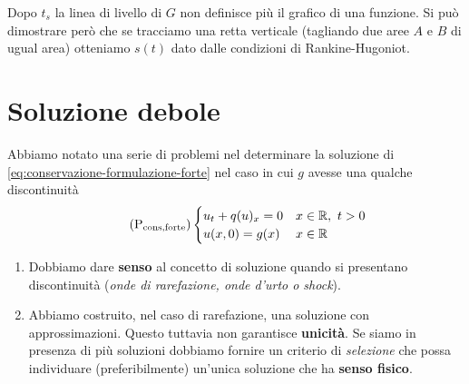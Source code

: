 Dopo $\displaystyle t_{s}$ la linea di livello di $G$ non definisce più il grafico di una funzione.
Si può dimostrare però che se tracciamo una retta verticale (tagliando due aree $A$ e $B$ di ugual area) otteniamo $\displaystyle s(t)$ dato dalle condizioni di Rankine-Hugoniot.


\section{Soluzione debole}

Abbiamo notato una serie di problemi nel determinare la soluzione di \eqref{eq:conservazione-formulazione-forte} nel caso in cui $g$ avesse una qualche discontinuità
\begin{equation}
    \tag{P$_{\text{cons,forte}}$}
    \begin{cases}
        u_{t} +q(u)_{x} =0 & x\in \mathbb{R} ,\ t >0 \\
        u(x,0) =g(x)       & x\in \mathbb{R}
    \end{cases}
    \label{eq:conservazione-formulazione-forte}
\end{equation}
\begin{enumerate}
    \item Dobbiamo dare \textbf{senso} al concetto di soluzione quando si presentano discontinuità (\textit{onde di rarefazione, onde d'urto o shock}).
    \item Abbiamo costruito, nel caso di rarefazione, una soluzione con approssimazioni. Questo tuttavia non garantisce \textbf{unicità}. Se siamo in presenza di più soluzioni dobbiamo fornire un criterio di \textit{selezione} che possa individuare (preferibilmente) un'unica soluzione che ha \textbf{senso fisico}.
\end{enumerate}

